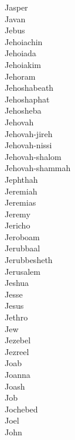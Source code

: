 Jasper  \\
Javan  \\
Jebus  \\
Jehoiachin  \\
Jehoiada  \\
Jehoiakim  \\
Jehoram  \\
Jehoshabeath  \\
Jehoshaphat  \\
Jehosheba  \\
Jehovah  \\
Jehovah-jireh  \\
Jehovah-nissi  \\
Jehovah-shalom  \\
Jehovah-shammah  \\
Jephthah  \\
Jeremiah  \\
Jeremias  \\
Jeremy  \\
Jericho  \\
Jeroboam  \\
Jerubbaal  \\
Jerubbesheth  \\
Jerusalem  \\
Jeshua  \\
Jesse  \\
Jesus  \\
Jethro  \\
Jew  \\
Jezebel  \\
Jezreel  \\
Joab  \\
Joanna  \\
Joash  \\
Job  \\
Jochebed  \\
Joel  \\
John  \\
